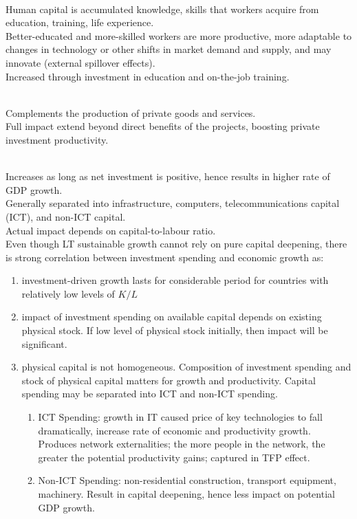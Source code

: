 \begin{remark} \\
Human capital is accumulated knowledge, skills that workers acquire from education, training, life experience.\\
Better-educated and more-skilled workers are more productive, more adaptable to changes in technology or other shifts in market demand and supply, and may innovate (external spillover effects).\\
Increased through investment in education and on-the-job training.
\end{remark}

\begin{remark} \\
Complements the production of private goods and services.\\
Full impact extend beyond direct benefits of the projects, boosting private investment productivity.
\end{remark}

\begin{remark} \\
Increases as long as net investment is positive, hence results in higher rate of GDP growth.\\
Generally separated into infrastructure, computers, telecommunications capital (ICT), and non-ICT capital.\\
Actual impact depends on capital-to-labour ratio.\\
Even though LT sustainable growth cannot rely on pure capital deepening, there is strong correlation between investment spending and economic growth as:
\begin{enumerate}[label=\roman*.]
\setlength{\itemsep}{0pt}
\item investment-driven growth lasts for considerable period for countries with relatively low levels of $K/L$
\item impact of investment spending on available capital depends on existing physical stock. If low level of physical stock initially, then impact will be significant.
\item physical capital is not homogeneous. Composition of investment spending and stock of physical capital matters for growth and productivity. Capital spending may be separated into ICT and non-ICT spending.
\begin{enumerate}[label=\arabic*.]
\setlength{\itemsep}{0pt}
\item ICT Spending: growth in IT caused price of key technologies to fall dramatically, increase rate of economic and productivity growth. Produces network externalities; the more people in the network, the greater the potential productivity gains; captured in TFP effect.
\item Non-ICT Spending: non-residential construction, transport equipment, machinery. Result in capital deepening, hence less impact on potential GDP growth.
\end{enumerate}
\end{enumerate}
\end{remark}

